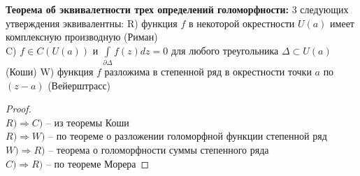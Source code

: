 \textbf{Теорема об эквивалетности трех определений голоморфности:}
3 следующих утверждения эквивалентны:
R) функция $f$ в некоторой окрестности $U(a)$ имеет комплексную производную (Риман) \\[2mm]
C) $f \in C(U(a))$ и $\int \limits_{\partial \Delta}f(z)dz = 0$ для любого треугольника $\Delta \subset U(a)$ (Коши) 
W) функция $f$ разложима в степенной ряд в окрестности точки $a$ по $(z-a)$ (Вейерштрасс)


\begin{proof}
	\ \\
	$R) \Rightarrow C)$ -- из теоремы Коши \\[2mm]
	$R) \Rightarrow W)$ -- по теореме о разложении голоморфной функции степенной ряд \\[2mm]
	$W) \Rightarrow R)$ -- теорема о голоморфности суммы степенного ряда \\[2mm]
	$C) \Rightarrow R)$ -- по теореме Морера
\end{proof}
